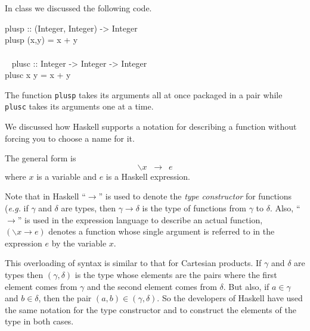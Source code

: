 \documentclass[11pt]{article}
\begin{document}

\section{}
In class we discussed the following code.

\begin{program*}

\> plusp :: (Integer, Integer) -> Integer \\
\> plusp (x,y) = x + y \\
\>   \\\
\> plusc :: Integer -> Integer -> Integer \\
\> plusc x y = x + y \\
\end{program*}


The function {\tt{plusp}} takes its arguments all at once packaged in a pair
while {\tt{plusc}} takes its arguments one at a time.

We discussed how Haskell supports a notation for describing a function without
forcing you to choose a name for it.

The general form is 
\[ \backslash x \;\;\rightarrow\:\; e \]
where $x$ is a variable and $e$ is a Haskell expression.

Note that in Haskell ``$\rightarrow$'' is used to denote the {\em{type
constructor}} for functions ({\em{e.g.}} if $\gamma$ and $\delta$ are types,
then $\gamma \rightarrow \delta$ is the type of functions from $\gamma$ to
$\delta$.  Also, ``$\rightarrow$'' is used in the expression language to
describe an actual function, $(\backslash x \rightarrow e)$ denotes a function
whose single argument is referred to in the expression $e$ by the variable $x$.

This overloading of syntax is similar to that for Cartesian products.  If
$\gamma$ and $\delta$ are types then $(\gamma,\delta)$ is the type whose
elements are the pairs where the first element comes from $\gamma$ and the
second element comes from $\delta$. But also, if $a\in\gamma$ and $b\in\delta$,
then the pair $(a,b)\in(\gamma,\delta)$.  So the developers of Haskell have
used the same notation for the type constructor and to construct the elements
of the type in both cases.
\end{document}
